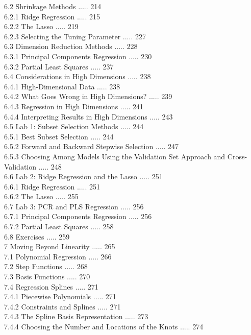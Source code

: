 \documentclass[10pt]{article}
\begin{document}
6.2 Shrinkage Methods ..... 214\\
6.2.1 Ridge Regression ..... 215\\
6.2.2 The Lasso ..... 219\\
6.2.3 Selecting the Tuning Parameter ..... 227\\
6.3 Dimension Reduction Methods ..... 228\\
6.3.1 Principal Components Regression ..... 230\\
6.3.2 Partial Least Squares ..... 237\\
6.4 Considerations in High Dimensions ..... 238\\
6.4.1 High-Dimensional Data ..... 238\\
6.4.2 What Goes Wrong in High Dimensions? ..... 239\\
6.4.3 Regression in High Dimensions ..... 241\\
6.4.4 Interpreting Results in High Dimensions ..... 243\\
6.5 Lab 1: Subset Selection Methods ..... 244\\
6.5.1 Best Subset Selection ..... 244\\
6.5.2 Forward and Backward Stepwise Selection ..... 247\\
6.5.3 Choosing Among Models Using the Validation Set Approach and Cross-Validation ..... 248\\
6.6 Lab 2: Ridge Regression and the Lasso ..... 251\\
6.6.1 Ridge Regression ..... 251\\
6.6.2 The Lasso ..... 255\\
6.7 Lab 3: PCR and PLS Regression ..... 256\\
6.7.1 Principal Components Regression ..... 256\\
6.7.2 Partial Least Squares ..... 258\\
6.8 Exercises ..... 259\\
7 Moving Beyond Linearity ..... 265\\
7.1 Polynomial Regression ..... 266\\
7.2 Step Functions ..... 268\\
7.3 Basis Functions ..... 270\\
7.4 Regression Splines ..... 271\\
7.4.1 Piecewise Polynomials ..... 271\\
7.4.2 Constraints and Splines ..... 271\\
7.4.3 The Spline Basis Representation ..... 273\\
7.4.4 Choosing the Number and Locations of the Knots ..... 274\\
\end{document}

